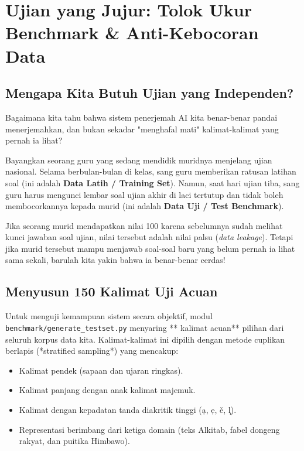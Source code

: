 \chapter{Ujian yang Jujur: Tolok Ukur Benchmark \& Anti-Kebocoran Data}

\section{Mengapa Kita Butuh Ujian yang Independen?}
Bagaimana kita tahu bahwa sistem penerjemah AI kita benar-benar pandai menerjemahkan, dan bukan sekadar "menghafal mati" kalimat-kalimat yang pernah ia lihat?

\begin{infobox}
Bayangkan seorang guru yang sedang mendidik muridnya menjelang ujian nasional. Selama berbulan-bulan di kelas, sang guru memberikan ratusan latihan soal (ini adalah \textbf{Data Latih / Training Set}). Namun, saat hari ujian tiba, sang guru harus mengunci lembar soal ujian akhir di laci tertutup dan tidak boleh membocorkannya kepada murid (ini adalah \textbf{Data Uji / Test Benchmark}). 

Jika seorang murid mendapatkan nilai 100 karena sebelumnya sudah melihat kunci jawaban soal ujian, nilai tersebut adalah nilai palsu (\textit{data leakage}). Tetapi jika murid tersebut mampu menjawab soal-soal baru yang belum pernah ia lihat sama sekali, barulah kita yakin bahwa ia benar-benar cerdas!
\end{infobox}

\section{Menyusun 150 Kalimat Uji Acuan}
Untuk menguji kemampuan sistem secara objektif, modul \texttt{benchmark/generate\_testset.py} menyaring **\StatBenchmarkSamples{} kalimat acuan** pilihan dari seluruh korpus data kita. Kalimat-kalimat ini dipilih dengan metode cuplikan berlapis (*stratified sampling*) yang mencakup:
\begin{itemize}
    \item Kalimat pendek (sapaan dan ujaran ringkas).
    \item Kalimat panjang dengan anak kalimat majemuk.
    \item Kalimat dengan kepadatan tanda diakritik tinggi (\d{a}, \d{e}, \v{e}, l᷊).
    \item Representasi berimbang dari ketiga domain (teks Alkitab, fabel dongeng rakyat, dan puitika Himbawo).
\end{itemize}

